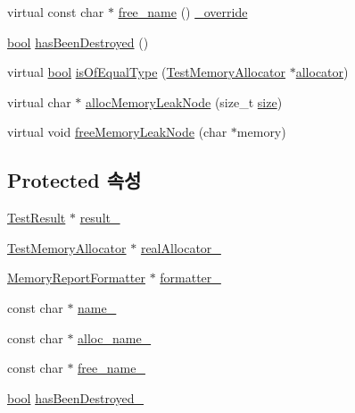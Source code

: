 \begin{DoxyCompactItemize}
\item 
virtual const char $\ast$ \hyperlink{class_memory_report_allocator_ac80755bbbec0c8edcbc9072b3640b68c}{free\+\_\+name} () \hyperlink{_cpp_u_test_config_8h_a049bea15dd750e15869863c94c1efc3b}{\+\_\+override}
\item 
\hyperlink{avb__gptp_8h_af6a258d8f3ee5206d682d799316314b1}{bool} \hyperlink{class_test_memory_allocator_ae26c82159ce24eb59770352585b402fd}{has\+Been\+Destroyed} ()
\item 
virtual \hyperlink{avb__gptp_8h_af6a258d8f3ee5206d682d799316314b1}{bool} \hyperlink{class_test_memory_allocator_a3d6a5cc2f6b7a38b3f1d3e0567bf4f93}{is\+Of\+Equal\+Type} (\hyperlink{class_test_memory_allocator}{Test\+Memory\+Allocator} $\ast$\hyperlink{_memory_leak_warning_test_8cpp_a83fc2e9b9142613f7df2bcc3ff8292bc}{allocator})
\item 
virtual char $\ast$ \hyperlink{class_test_memory_allocator_a1a786ad58b46528e82235a14fa667c1d}{alloc\+Memory\+Leak\+Node} (size\+\_\+t \hyperlink{gst__avb__playbin_8c_a439227feff9d7f55384e8780cfc2eb82}{size})
\item 
virtual void \hyperlink{class_test_memory_allocator_a10f2958f3b7378256e933896ccc93df0}{free\+Memory\+Leak\+Node} (char $\ast$memory)
\end{DoxyCompactItemize}
\subsection*{Protected 속성}
\begin{DoxyCompactItemize}
\item 
\hyperlink{class_test_result}{Test\+Result} $\ast$ \hyperlink{class_memory_report_allocator_acf81b99797e96c7d602ffc4c3cb012b0}{result\+\_\+}
\item 
\hyperlink{class_test_memory_allocator}{Test\+Memory\+Allocator} $\ast$ \hyperlink{class_memory_report_allocator_ab9c67fc1ce22037b740577262578c47f}{real\+Allocator\+\_\+}
\item 
\hyperlink{class_memory_report_formatter}{Memory\+Report\+Formatter} $\ast$ \hyperlink{class_memory_report_allocator_a09aec3af9ca6c3c27226a1aaaea13987}{formatter\+\_\+}
\item 
const char $\ast$ \hyperlink{class_test_memory_allocator_a7dac8366c11fbcad2f49d85fe8fc4fbe}{name\+\_\+}
\item 
const char $\ast$ \hyperlink{class_test_memory_allocator_ae5a98ff3b709da10db95a0ed03362548}{alloc\+\_\+name\+\_\+}
\item 
const char $\ast$ \hyperlink{class_test_memory_allocator_a4f7ece205625129df190e624cccf9286}{free\+\_\+name\+\_\+}
\item 
\hyperlink{avb__gptp_8h_af6a258d8f3ee5206d682d799316314b1}{bool} \hyperlink{class_test_memory_allocator_a971604f223534e64d5024d63396b397a}{has\+Been\+Destroyed\+\_\+}
\end{DoxyCompactItemize}


